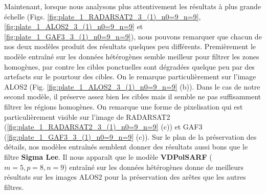 


Maintenant, lorsque nous analysons plus attentivement les résultats à plus grande échelle (Figs. \ref{fig:plate_1_RADARSAT2_3_(1)_n0=9_n=9},  \ref{fig:plate_1_ALOS2_3_(1)_n0=9_n=9} et \ref{fig:plate_1_GAF3_3_(1)_n0=9_n=9}), nous pouvons remarquer que chacun de nos deux modèles produit des résultats quelques peu différents.  Premièrement le modèle entraîné sur les données hétérogènes semble meilleur pour filtrer les zones homogènes, par contre les cibles ponctuelles sont dégradées quelque peu par des artefacts sur le pourtour des cibles.  On le remarque particulièrement sur l'image ALOS2 (Fig. \ref{fig:plate_1_ALOS2_3_(1)_n0=9_n=9} (b)).  Dans le cas de notre second modèle, il préserve assez bien les cibles mais il semble ne pas suffisamment filtrer les régions homogènes.  On remarque une forme de pixelisation qui est particulièrement visible sur l'image de RADARSAT2 (\ref{fig:plate_1_RADARSAT2_3_(1)_n0=9_n=9} (c)) et GAF3 (\ref{fig:plate_1_GAF3_3_(1)_n0=9_n=9} (c)).  Sur le plan de la préservation des détails, nos modèles entraînés semblent donner des résultats aussi bons que le filtre \textbf{Sigma Lee}. Il nous apparaît que le modèle \textbf{VDPolSARF} ($m=5, p=8, n=9$) entraîné sur les données hétérogènes donne de meilleurs résultats sur les images ALOS2 pour la préservation des arêtes que les autres filtres.










